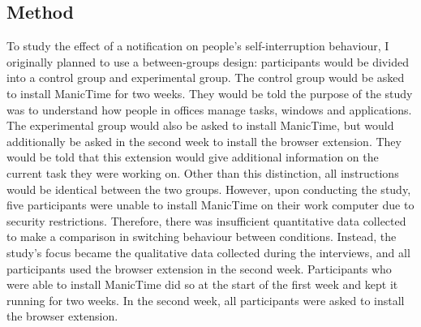 \subsection{Method}
To study the effect of a notification on people's self-interruption behaviour, I originally planned to use a between-groups design: participants would be divided into a control group and experimental group. The control group would be asked to install ManicTime for two weeks. They would be told the purpose of the study was to understand how people in offices manage tasks, windows and applications. The experimental group would also be asked to install ManicTime, but would additionally be asked in the second week to install the browser extension. They would be told that this extension would give additional information on the current task they were working on. Other than this distinction, all instructions would be identical between the two groups. However, upon conducting the study, five participants were unable to install ManicTime on their work computer due to security restrictions. Therefore, there was insufficient quantitative data collected to make a comparison in switching behaviour between conditions. Instead, the study's focus became the qualitative data collected during the interviews, and all participants used the browser extension in the second week. Participants who were able to install ManicTime did so at the start of the first week and kept it running for two weeks. In the second week, all participants were asked to install the browser extension.


